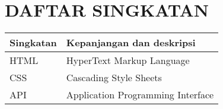 {}
\chapter*{DAFTAR SINGKATAN}

\begin{longtable}{|l|l|}
  \hline
  \rowcolor[HTML]{C0C0C0}
  \textbf{Singkatan} & \textbf{Kepanjangan dan deskripsi} \\
  \hline
  HTML & HyperText Markup Language \\
  \hline
  CSS & Cascading Style Sheets \\
  \hline
  API & Application Programming Interface \\
  \hline
\end{longtable}

\cleardoublepage
